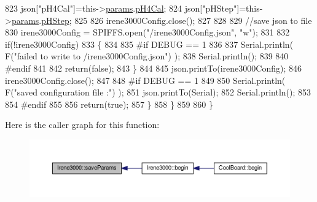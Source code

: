 \begin{DoxyCode}
823             json[\textcolor{stringliteral}{"pH4Cal"}]=this->\hyperlink{class_irene3000_a136585a5ee7f9ac6ab52175fa153f8e3}{params}.\hyperlink{struct_irene3000_1_1parameters___t_a1144de6fb54eb3e1dd2a3d8c2afc97dc}{pH4Cal};
824             json[\textcolor{stringliteral}{"pHStep"}]=this->\hyperlink{class_irene3000_a136585a5ee7f9ac6ab52175fa153f8e3}{params}.\hyperlink{struct_irene3000_1_1parameters___t_a61cfcc2539d5f630e9071f3753aba9fe}{pHStep};         
825             
826             irene3000Config.close();
827             
828             
829             \textcolor{comment}{//save json to file}
830             irene3000Config = SPIFFS.open(\textcolor{stringliteral}{"/irene3000Config.json"}, \textcolor{stringliteral}{"w"});
831 
832             \textcolor{keywordflow}{if}(!irene3000Config)
833             \{
834             
835 \textcolor{preprocessor}{            #if DEBUG == 1}
836 
837                 Serial.println( F(\textcolor{stringliteral}{"failed to write to /irene3000Config.json"}) );
838                 Serial.println();
839             
840 \textcolor{preprocessor}{            #endif }
841 
842                 \textcolor{keywordflow}{return}(\textcolor{keyword}{false});
843             \}
844 
845             json.printTo(irene3000Config);
846             irene3000Config.close();
847             
848 \textcolor{preprocessor}{        #if DEBUG == 1 }
849 
850             Serial.println( F(\textcolor{stringliteral}{"saved configuration file :"})  );
851             json.printTo(Serial);
852             Serial.println();
853         
854 \textcolor{preprocessor}{        #endif}
855 
856             \textcolor{keywordflow}{return}(\textcolor{keyword}{true}); 
857         \}
858     \}   
859 
860 \}
\end{DoxyCode}
Here is the caller graph for this function\+:\nopagebreak
\begin{figure}[H]
\begin{center}
\leavevmode
\includegraphics[width=350pt]{d6/d03/class_irene3000_a63dbd38e79b8cd5f1fba4b245501a894_icgraph}
\end{center}
\end{figure}
\mbox{\label{class_irene3000_aff7c5da186b388e7272e63ff88a20c34}} 
